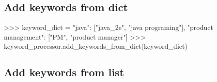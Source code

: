 \documentclass{article}
\begin{document}
\subsection{Add keywords from dict}
\begin{ipythoncode}

>>> keyword_dict = {
        "java": ["java_2e", "java programing"],
        "product management": ["PM", "product manager"]
    }
>>> keyword_processor.add_keywords_from_dict(keyword_dict)
\end{ipythoncode}
\subsection{Add keywords from list}
\begin{ipythoncode}
>>> keyword_processor.add_keywords_from_list(["java", "python"]})
\end{ipythoncode}
\end{document}
